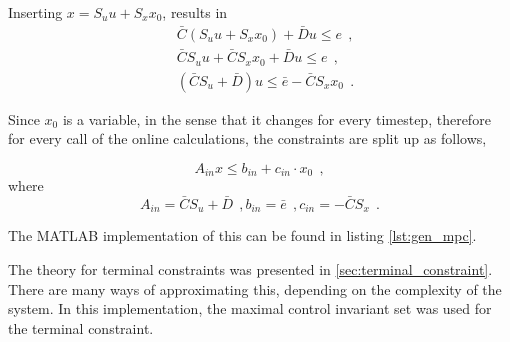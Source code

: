 Inserting $x = S_u u + S_x x_0$, results in 
\begin{equation}
    \begin{split}
        &\bar C(S_u u + S_x x_0) + \bar D u \leq e \: \: , \\
        &\bar C S_u u + \bar C S_x x_0 + \bar D u \leq e \: \: , \\
        &(\bar C S_u + \bar D) u \leq \bar e - \bar C S_x x_0 \: \: .
    \end{split}
\end{equation}

Since $x_0$ is a variable, in the sense that it changes for every timestep, therefore for every call of the online calculations, the constraints are split up as follows,

\begin{equation}
    A_{in} x \leq b_{in} + c_{in} \cdot x_0 \: \: ,
\end{equation}
where
\begin{equation}
    A_{in} = \bar C S_u + \bar D\: \: , b_{in} = \bar e \: \: , c_{in} = -\bar C S_x \: \: .
\end{equation}



The MATLAB implementation of this can be found in listing \ref{lst:gen_mpc}. 



The theory for terminal constraints was presented in \ref{sec:terminal_constraint}. There are many ways of approximating this, depending on the complexity of the system. In this implementation, the maximal control invariant set was used for the terminal constraint. 


